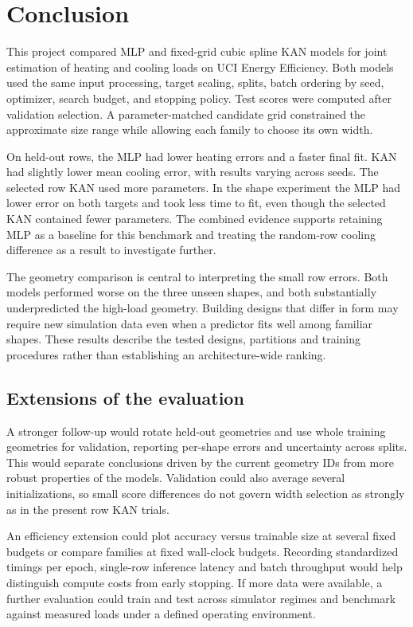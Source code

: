 \documentclass[11pt,twocolumn,letterpaper]{article}
\begin{document}
\section{Conclusion}
This project compared MLP and fixed-grid cubic spline KAN models for joint estimation of heating and cooling loads on UCI Energy Efficiency. Both models used the same input processing, target scaling, splits, batch ordering by seed, optimizer, search budget, and stopping policy. Test scores were computed after validation selection. A parameter-matched candidate grid constrained the approximate size range while allowing each family to choose its own width.

On held-out rows, the MLP had lower heating errors and a faster final fit. KAN had slightly lower mean cooling error, with results varying across seeds. The selected row KAN used more parameters. In the shape experiment the MLP had lower error on both targets and took less time to fit, even though the selected KAN contained fewer parameters. The combined evidence supports retaining MLP as a baseline for this benchmark and treating the random-row cooling difference as a result to investigate further.

The geometry comparison is central to interpreting the small row errors. Both models performed worse on the three unseen shapes, and both substantially underpredicted the high-load geometry. Building designs that differ in form may require new simulation data even when a predictor fits well among familiar shapes. These results describe the tested designs, partitions and training procedures rather than establishing an architecture-wide ranking.

\subsection{Extensions of the evaluation}
A stronger follow-up would rotate held-out geometries and use whole training geometries for validation, reporting per-shape errors and uncertainty across splits. This would separate conclusions driven by the current geometry IDs from more robust properties of the models. Validation could also average several initializations, so small score differences do not govern width selection as strongly as in the present row KAN trials.

An efficiency extension could plot accuracy versus trainable size at several fixed budgets or compare families at fixed wall-clock budgets. Recording standardized timings per epoch, single-row inference latency and batch throughput would help distinguish compute costs from early stopping. If more data were available, a further evaluation could train and test across simulator regimes and benchmark against measured loads under a defined operating environment.
\end{document}
